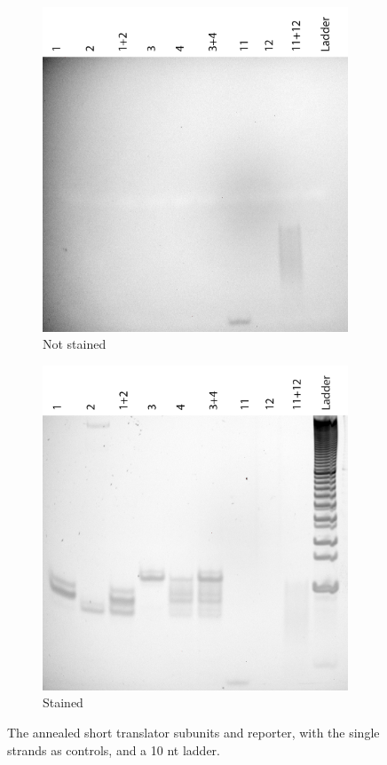 \begin{figure}
\begin{subfigure}{.49\columnwidth}
  \centering
  \includegraphics[width=\linewidth]{images/transcription_annealed_nostain.png}
  \caption{Not stained}
\end{subfigure}
\hfill
\begin{subfigure}{.49\columnwidth}
  \centering
  \includegraphics[width=\linewidth]{images/transcription_annealed_stain.png}
  \caption{Stained}
\end{subfigure}
\caption{The annealed short translator subunits and reporter, with the single strands as controls, and a 10 nt ladder.}
\label{transcription_annealed}
\end{figure}

